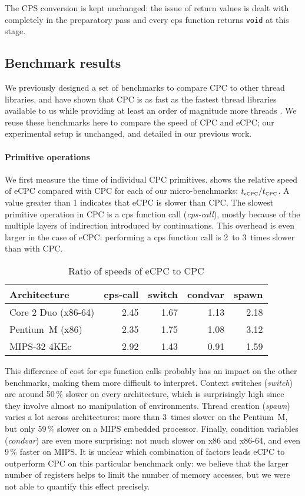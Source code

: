 \documentclass[a4paper]{llncs}
\begin{document}
The CPS conversion is kept unchanged: the issue of return values is dealt with
completely in the preparatory pass and every cps function returns \texttt{void} at
this stage.


\subsection{Benchmark results}
\label{sec:ecpc-bench}

We previously designed a set of benchmarks to compare CPC to other thread
libraries, and have shown that CPC is as fast as the fastest thread libraries
available to us while providing at least an order of magnitude more threads
\cite{kerneis2011}.  We reuse these benchmarks here to compare the speed of CPC
and eCPC; our experimental setup is unchanged, and detailed in our previous
work.

\paragraph{Primitive operations}

We first measure the time of individual CPC primitives.   shows
the relative speed of eCPC compared with CPC for each of our micro-benchmarks:
$t_{\mbox{\tiny eCPC}} / t_{\mbox{\tiny CPC}}$.  A value greater than 1 indicates that eCPC
is slower than CPC.  The slowest primitive operation in CPC is a cps function
call (\emph{cps-call}), mostly because of the multiple layers of indirection
introduced by continuations.  This overhead is even larger in the case of eCPC:
performing a cps function call is 2~to 3~times slower than with CPC.
\begin{table}[htb]
\caption{Ratio of speeds of eCPC to CPC}
\centering
\begin{tabular}{lrrrr}
\toprule
Architecture          & cps-call & switch & condvar & spawn
\tabularnewline
\midrule
Core 2 Duo (x86-64)   &    2.45  & 1.67   & 1.13    & 2.18   \\
  Pentium~M (x86)  &  2.35 & 1.75  & 1.08  & 3.12  \\
   MIPS-32 4KEc  &  2.92 & 1.43  & 0.91  & 1.59  \\
\bottomrule
\end{tabular}
\label{tab:speed}
\end{table}

This difference of cost for cps function calls probably has an impact on the
other benchmarks, making them more difficult to interpret.  Context switches
(\emph{switch}) are around 50\,\% slower on every architecture, which is
surprisingly high since they involve almost no manipulation of environments.
Thread creation (\emph{spawn}) varies a lot across architectures: more than
3~times slower on the Pentium~M, but only 59\,\% slower on a MIPS embedded
processor.  Finally, condition variables (\emph{condvar}) are even more
surprising: not much slower on x86 and x86-64, and even 9\,\% faster on MIPS.
It is unclear which combination of factors leads eCPC to outperform CPC on this
particular benchmark only: we believe that the larger number of registers helps
to limit the number of memory accesses, but we were not able to quantify this
effect precisely.
\end{document}
